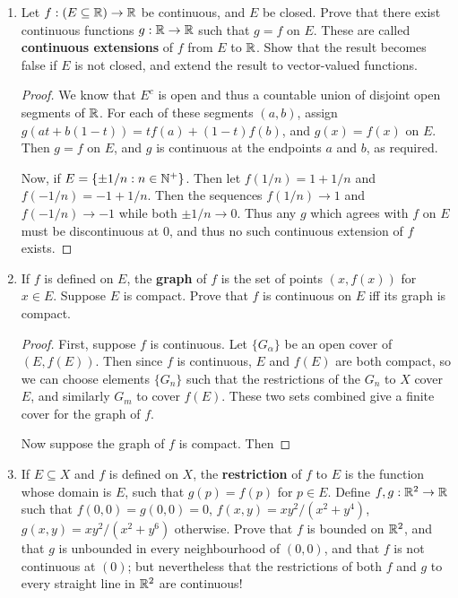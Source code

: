 \begin{enumerate}
\begin{proof}
    Notice that $E$ is a dense subset of $Z = Z(g-f)$. Thus, $\overline{E} = X \subseteq \overline{Z} \subseteq X$, so in particular, $X = Z$ since $Z$ is closed from the previous Exercise, completing the proof.
\end{proof}

\item %
    Let $f: (E \subseteq \mathbb{R}) \rightarrow \mathbb{R}$ be continuous, and $E$ be closed. Prove that there exist continuous functions $g: \mathbb{R} \rightarrow \mathbb{R}$ such that $g = f$ on $E$. These are called \textbf{continuous extensions} of $f$ from $E$ to $\mathbb{R}$. Show that the result becomes false if $E$ is not closed, and extend the result to vector-valued functions.

\begin{proof}
    We know that $E^c$ is open and thus a countable union of disjoint open segments of $\mathbb{R}$. For each of these segments $(a, b)$, assign $g(at + b(1-t)) = tf(a) + (1-t)f(b)$, and $g(x) = f(x)$ on $E$. Then $g = f$ on $E$, and $g$ is continuous at the endpoints $a$ and $b$, as required.
    
    Now, if $E = \{\pm 1/n: n \in \mathbb{N}^+\}$. Then let $f(1/n) = 1+1/n$ and $f(-1/n) = -1+1/n$. Then the sequences $f(1/n) \to 1$ and $f(-1/n) \to -1$ while both $\pm 1/n \to 0$. Thus any $g$ which agrees with $f$ on $E$ must be discontinuous at $0$, and thus no such continuous extension of $f$ exists.
\end{proof}

\item %
If $f$ is defined on $E$, the \textbf{graph} of $f$ is the set of points $(x, f(x))$ for $x \in E$. Suppose $E$ is compact. Prove that $f$ is continuous on $E$ iff its graph is compact.

\begin{proof}
    First, suppose $f$ is continuous. Let $\{G_\alpha\}$ be an open cover of $(E, f(E))$. Then since $f$ is continuous, $E$ and $f(E)$ are both compact, so we can choose elements $\{G_n\}$ such that the restrictions of the $G_n$ to $X$ cover $E$, and similarly $G_m$ to cover $f(E)$. These two sets combined give a finite cover for the graph of $f$.

    Now suppose the graph of $f$ is compact. Then \TODO
\end{proof}

\item %
If $E \subseteq X$ and $f$ is defined on $X$, the \textbf{restriction} of $f$ to $E$ is the function whose domain is $E$, such that $g(p) = f(p)$ for $p \in E$. Define $f, g: \mathbb{R}^2 \rightarrow \mathbb{R}$ such that $f(0, 0) = g(0, 0) = 0$, $f(x, y) = xy^2/(x^2 + y^4)$, $g(x, y) = xy^2/(x^2 + y^6)$ otherwise. Prove that $f$ is bounded on $\mathbb{R}^2$, and that $g$ is unbounded in every neighbourhood of $(0, 0)$, and that $f$ is not continuous at $( 0)$; but nevertheless that the restrictions of both $f$ and $g$ to every straight line in $\mathbb{R}^2$ are continuous!


\end{enumerate}

